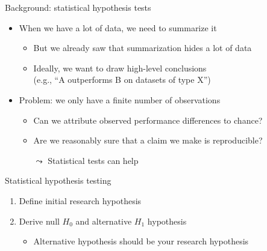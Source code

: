 	\begin{frame}[c]{Background: statistical hypothesis tests}
		
		\begin{itemize}
			\item When we have a lot of data, we need to summarize it
			\begin{itemize}
				\item But we already saw that summarization hides a lot of data
				\item Ideally, we want to draw high-level conclusions\\
				(e.g., ``A outperforms B on datasets of type X'')
			\end{itemize}
			
			\pause
			\bigskip
			
			\item Problem: we only have a finite number of observations
			\begin{itemize}
				\item Can we attribute observed performance differences to chance?
				\item Are we reasonably sure that a claim we make is reproducible?
				\item[$\leadsto$] Statistical tests can help
			\end{itemize}
			
			
		\end{itemize}
		
		\medskip
		
	\end{frame}
	\begin{frame}[c]{Statistical hypothesis testing}
		
		\begin{enumerate}
			\item Define initial research hypothesis
			\pause
			\item Derive null $H_0$ and alternative $H_1$ hypothesis
			\begin{itemize}
				\item Alternative hypothesis should be your research hypothesis
			\end{itemize}
		\end{enumerate}	
		
	\end{frame}
